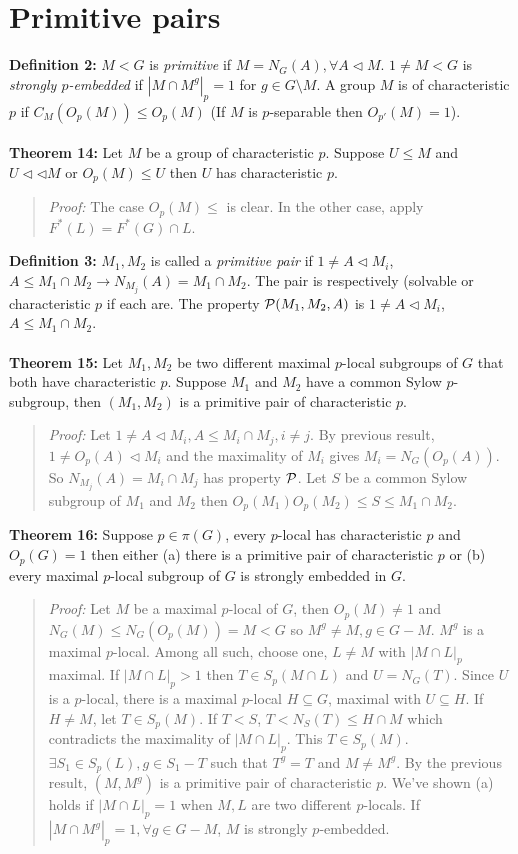 \section {Primitive pairs}
{\bf Definition 2:} $M<G$ is \emph{primitive} if $M=N_G(A), \forall A \lhd M$. $1 \ne M <G$ is
\emph{strongly $p$-embedded} if $|M \cap M^g|_p = 1$ for $g \in G \setminus M$.
A group $M$ is of characteristic $p$ if $C_M(O_p(M)) \leq O_p(M)$ (If
$M$ is $p$-separable then $O_{p'}(M)=1$).
\\
\\
{\bf Theorem 14:}
Let $M$ be a group of characteristic $p$.
Suppose $U \le M$ and $U \lhd \lhd M$ or $O_p(M) \le U$ then
$U$ has characteristic $p$.
\begin{quote}
\emph{Proof:}  
The case $O_p(M) \leq $ is clear.  In the other case, apply $F^*(L) =F^*(G) \cap L$.
\end{quote}
{\bf Definition 3:}  $M_1, M_2$ is called a \emph{primitive pair} if $1 \ne A \lhd M_i$,
$A \le M_1 \cap M_2 \rightarrow N_{M_j}(A)= M_1 \cap M_2$.  The pair is respectively
(solvable or characteristic $p$ if each are.  The property ${\cal P}(M_1 , M_2, A)$ is
$1 \neq A \lhd M_i$, $A \leq M_1 \cap M_2$.
\\
\\
{\bf Theorem 15:}
Let $M_1, M_2$ be two different maximal $p$-local subgroups of $G$ that both have characteristic $p$.
Suppose $M_1$ and $M_2$ have a common Sylow $p$-subgroup, then $(M_1 , M_2)$ is a primitive pair of 
characteristic $p$.
\begin{quote}
\emph{Proof:}  
Let $1 \neq A \lhd M_i, A \leq M_i \cap M_j, i \neq j$.  By previous result,
$1 \neq O_p(A) \lhd M_i$ and the maximality of $M_i$ gives $M_i= N_G(O_p(A))$.  So
$N_{M_j}(A)= M_i \cap M_j$ has property ${\cal P}$.  Let $S$ be a common Sylow subgroup of
$M_1$ and $M_2$ then $O_p(M_1 ) O_p(M_2 ) \leq S \leq M_1 \cap M_2$.
\end{quote}
{\bf Theorem 16:}
Suppose $p \in \pi(G)$, every $p$-local has characteristic $p$ and $O_p(G)=1$ then either
(a) there is a primitive pair of characteristic $p$ or (b)
every maximal $p$-local subgroup of $G$ is strongly embedded in $G$.
\begin{quote}
\emph{Proof:}  
Let $M$ be a maximal $p$-local of $G$, then $O_p(M) \neq 1$ and
$N_G(M) \leq N_G(O_p(M))=M < G$ so $M^g \neq M, g \in G-M$.  $M^g$ is a maximal $p$-local.
Among all such, choose one, $L \neq M$ with $|M \cap L|_p$ maximal.
If $|M \cap L|_p>1$ then $T \in S_p(M \cap L)$ and $U= N_G(T)$.
Since $U$ is a $p$-local, there is a maximal $p$-local $H \subseteq G$, maximal with $U \subseteq H$.
If $H \neq M$, let $T \in S_p(M)$.  If $T<S$, $T<N_S(T) \leq H \cap M$ which contradicts the maximality of
$|M \cap L|_p$.  This $T \in S_p(M)$.  $\exists S_1 \in S_p(L), g \in S_1 - T$ such that $T^g=T$ and
$M \neq M^g$.  By the previous result, $(M, M^g)$ is a primitive pair of characteristic $p$.  We've shown (a)
holds if $|M \cap L|_p = 1$ when $M, L$ are two different $p$-locals.   If $|M \cap M^g|_p=1, \forall g \in G - M$,
$M$ is strongly $p$-embedded.
\end{quote}

